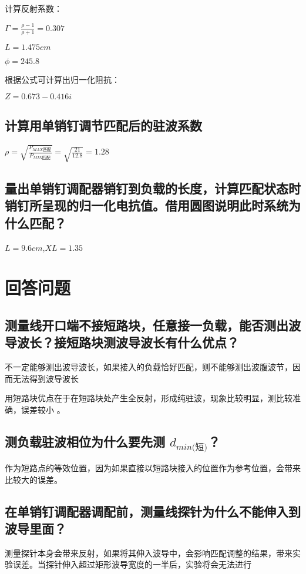 \documentclass{../source/zjureport}
\begin{document}
        计算反射系数：

        $\Gamma = \displaystyle \frac{\rho - 1}{\rho + 1} = 0.307$

        $L = 1.475cm$

        $\phi = 245.8$

        根据公式可计算出归一化阻抗：

        $Z=0.673-0.416i$

        \subsection{计算用单销钉调节匹配后的驻波系数}
        $\rho = \sqrt{\displaystyle \frac{P_{MAX\text{匹配}}}{P_{MIN\text{匹配}}}} = \sqrt{\displaystyle \frac{21}{12.8}} = 1.28$

        \subsection{量出单销钉调配器销钉到负载的长度，计算匹配状态时销钉所呈现的归一化电抗值。借用圆图说明此时系统为什么匹配？}
        $L = 9.6cm$,$XL = 1.35$

    \section{回答问题}
        \subsection{测量线开口端不接短路块，任意接一负载，能否测出波导波长？接短路块测波导波长有什么优点？}
        不一定能够测出波导波长，如果接入的负载恰好匹配，则不能够测出波腹波节，因而无法得到波导波长

        用短路块优点在于在短路块处产生全反射，形成纯驻波，现象比较明显，测比较准确，误差较小 。

        \subsection{测负载驻波相位为什么要先测 $d_{min\text{(短)}}$？}
        作为短路点的等效位置，因为如果直接以短路块接入的位置作为参考位置，会带来比较大的误差。

        \subsection{在单销钉调配器调配前，测量线探针为什么不能伸入到波导里面？}
        测量探针本身会带来反射，如果将其伸入波导中，会影响匹配调整的结果，带来实验误差。当探针伸入超过矩形波导宽度的一半后，实验将会无法进行
\end{document}
